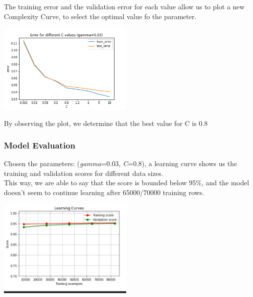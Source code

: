 The training error and the validation error for each value allow us to plot a new Complexity Curve, to select the optimal value fo the parameter.
\begin{center}
    \captionsetup{type=figure}
    \includegraphics[width=250px]{comp_curve_svm_C.png}
\end{center}
By observing the plot, we determine that the best value for C is 0.8

\subsubsection{Model Evaluation}
Chosen the parameters: (\emph{gamma}=0.03, \emph{C}=0.8), a learning curve shows us the training and validation scores for different data sizes.\\
This way, we are able to say that the score is bounded below 95\%, and the model doesn't seem to continue learning after 65000/70000 training rows.
\begin{center}
    \captionsetup{type=figure}
    \includegraphics[width=250px]{learning_curve_svm.png}
\end{center}
